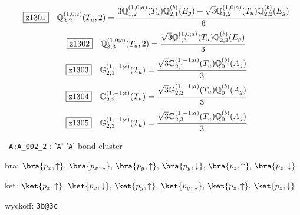\documentclass[fleqn,10pt,landscape]{jsarticle}
\begin{document}
\begin{dmath*}
\hspace*{3mm}\fbox{z1301}\quad \mathbb{Q}_{3,2}^{(1,0;c)}(T_{u},2)=\frac{3 \mathbb{Q}_{1,2}^{(1,0;a)}(T_{u}) \mathbb{Q}_{2,1}^{(b)}(E_{g}) - \sqrt{3} \mathbb{Q}_{1,2}^{(1,0;a)}(T_{u}) \mathbb{Q}_{2,2}^{(b)}(E_{g})}{6}
\end{dmath*}
\begin{dmath*}
\hspace*{3mm}\fbox{z1302}\quad \mathbb{Q}_{3,3}^{(1,0;c)}(T_{u},2)=\frac{\sqrt{3} \mathbb{Q}_{1,3}^{(1,0;a)}(T_{u}) \mathbb{Q}_{2,2}^{(b)}(E_{g})}{3}
\end{dmath*}
\begin{dmath*}
\hspace*{3mm}\fbox{z1303}\quad \mathbb{G}_{2,1}^{(1,-1;c)}(T_{u})=\frac{\sqrt{3} \mathbb{G}_{2,1}^{(1,-1;a)}(T_{u}) \mathbb{Q}_{0}^{(b)}(A_{g})}{3}
\end{dmath*}
\begin{dmath*}
\hspace*{3mm}\fbox{z1304}\quad \mathbb{G}_{2,2}^{(1,-1;c)}(T_{u})=\frac{\sqrt{3} \mathbb{G}_{2,2}^{(1,-1;a)}(T_{u}) \mathbb{Q}_{0}^{(b)}(A_{g})}{3}
\end{dmath*}
\begin{dmath*}
\hspace*{3mm}\fbox{z1305}\quad \mathbb{G}_{2,3}^{(1,-1;c)}(T_{u})=\frac{\sqrt{3} \mathbb{G}_{2,3}^{(1,-1;a)}(T_{u}) \mathbb{Q}_{0}^{(b)}(A_{g})}{3}
\end{dmath*}
\vspace{5mm}

\noindent\textbullet\, \texttt{A;A_002_2} : '\texttt{A}'-'\texttt{A}' bond-cluster

\noindent\quad * bra: $\bra{p_{x},\uparrow},\, \bra{p_{x},\downarrow},\, \bra{p_{y},\uparrow},\, \bra{p_{y},\downarrow},\, \bra{p_{z},\uparrow},\, \bra{p_{z},\downarrow}$

\noindent\quad * ket: $\ket{p_{x},\uparrow},\, \ket{p_{x},\downarrow},\, \ket{p_{y},\uparrow},\, \ket{p_{y},\downarrow},\, \ket{p_{z},\uparrow},\, \ket{p_{z},\downarrow}$

\noindent\quad * wyckoff: \texttt{3b@3c}
\end{document}
